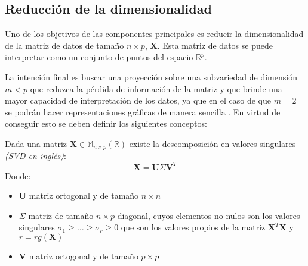 \newpage
\subsection{Reducción de la dimensionalidad}

\noindent Uno de los objetivos de las componentes principales es reducir la dimensionalidad de la matriz de datos de tamaño $n\times p$, \textbf{X}. Esta matriz de datos se puede interpretar como un conjunto de puntos del espacio $\mathbb{R}^p$. 

\noindent La intención final es buscar una proyección sobre una subvariedad de dimensión $m<p$ que reduzca la pérdida de información de la matriz y que brinde una mayor capacidad de interpretación de los datos, ya que en el caso de que $m=2$ se podrán hacer representaciones gráficas de manera sencilla . En virtud de conseguir esto se deben definir los siguientes conceptos:

\begin{defi}
Dada una matriz $\textbf{X}\in  \mathbb{M}_{n\times p}(\mathbb{R})$ existe la descomposición en valores singulares \textit{(SVD en inglés)}:
\begin{equation}
\textbf{X}=\textbf{U}\Sigma\textbf{V}^T
\end{equation}
Donde:
\begin{itemize}
\item \textbf{U} matriz ortogonal y de tamaño $n \times n$
\item $\Sigma$ matriz de tamaño $n \times p $ diagonal, cuyos elementos no nulos son los valores singulares $\sigma_1\geq\ldots\geq \sigma_r\geq 0$ que son los valores propios de la matriz $\textbf{X}^T\textbf{X}$ y $r=rg(\textbf{X})$
\item \textbf{V} matriz ortogonal y de tamaño $p \times p$
\end{itemize}
\end{defi}

